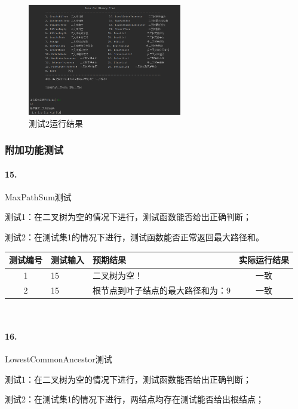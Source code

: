 \documentclass[supercite]{Experimental_Report}
\theoremstyle{definition}
\begin{document}
~\

\begin{figure}[H]
 	\centering
 	\includegraphics[width=0.6\textwidth]{images/二叉树测试14.png}
 	\caption{测试2运行结果}
 	\label{txlab}
 \end{figure}

\subsubsection{附加功能测试}

\paragraph{15.}MaxPathSum测试
	
测试1：在二叉树为空的情况下进行，测试函数能否给出正确判断；

测试2：在测试集1的情况下进行，测试函数能否正常返回最大路径和。

\vspace{0.5em}

\begin{tabular}{|c|p{2.7cm}|p{6cm}|c|}
	\hline
	测试编号 & 测试输入 & 预期结果 & 实际运行结果 \\
	\hline
	1 & 15 & 二叉树为空！ & 一致 \\
	\hline
	2 & 15 & 根节点到叶子结点的最大路径和为：9 & 一致 \\
	\hline
\end{tabular}

~\

\paragraph{16.}LowestCommonAncestor测试
	
测试1：在二叉树为空的情况下进行，测试函数能否给出正确判断；

测试2：在测试集1的情况下进行，两结点均存在测试能否给出根结点；
\end{document}
